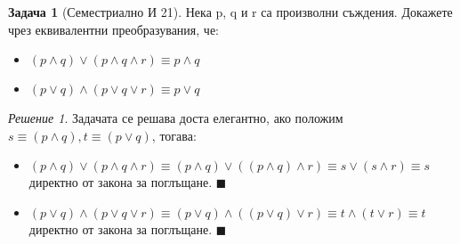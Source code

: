 \documentclass[10pt, a4paper]{article}
\theoremstyle{definition}
\newtheorem{problem}{Задача}
\theoremstyle{remark}
\newtheorem*{sol}{Решение}
\begin{document}
\hfill
\begin{problem}[Семестриално И 21]
Нека p, q и r са произволни съждения. Докажете чрез еквивалентни преобразувания, че:
\begin{itemize}
    \item \((p\wedge q)\vee(p\wedge q\wedge r)\equiv p\wedge q\)
    \item \((p\vee q)\wedge(p\vee q\vee r)\equiv p\vee q\)
\end{itemize}
\end{problem}
\begin{sol}
    Задачата се решава доста елегантно, ако положим \(s\equiv(p\wedge q), t\equiv(p\vee q)\), тогава:
    \begin{itemize}
        \item \((p\wedge q)\vee(p\wedge q\wedge r)\equiv (p\wedge q)\vee((p\wedge q)\wedge r) \equiv s\vee(s\wedge r) \equiv s\) директно от закона за поглъщане. \(\blacksquare\)
        \item \((p\vee q)\wedge(p\vee q\vee r)\equiv (p\vee q)\wedge((p\vee q)\vee r) \equiv t\wedge(t\vee r) \equiv t\) директно от закона за поглъщане. \(\blacksquare\)
    \end{itemize}
\end{sol}
\end{document}
